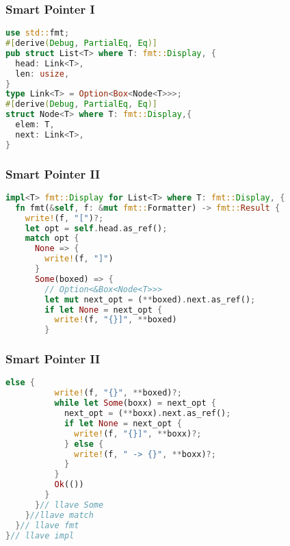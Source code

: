 \documentclass{beamer}
\begin{document}
\begin{frame}[fragile]
  \frametitle{Smart Pointer I}
  \begin{lstlisting}[language=Rust , style=boxed ]
use std::fmt;
#[derive(Debug, PartialEq, Eq)]
pub struct List<T> where T: fmt::Display, {
  head: Link<T>,
  len: usize,
}
type Link<T> = Option<Box<Node<T>>>;
#[derive(Debug, PartialEq, Eq)]
struct Node<T> where T: fmt::Display,{
  elem: T,
  next: Link<T>,
}\end{lstlisting}
\end{frame}

\begin{frame}[fragile]
  \frametitle{Smart Pointer II}
  \begin{lstlisting}[language=Rust , style=boxed ]
impl<T> fmt::Display for List<T> where T: fmt::Display, {
  fn fmt(&self, f: &mut fmt::Formatter) -> fmt::Result {
    write!(f, "[")?;
    let opt = self.head.as_ref();
    match opt {
      None => {
        write!(f, "]")
      }
      Some(boxed) => {
        // Option<&Box<Node<T>>>
        let mut next_opt = (**boxed).next.as_ref();
        if let None = next_opt {
          write!(f, "{}]", **boxed)
        }\end{lstlisting}
\end{frame}

\begin{frame}[fragile]
  \frametitle{Smart Pointer II}
  \begin{lstlisting}[language=Rust , style=boxed ]
        else {
          write!(f, "{}", **boxed)?;
          while let Some(boxx) = next_opt {
            next_opt = (**boxx).next.as_ref();
            if let None = next_opt {
              write!(f, "{}]", **boxx)?;
            } else {
              write!(f, " -> {}", **boxx)?;
            }
          }
          Ok(())
        }
      }// llave Some
    }//llave match
  }// llave fmt
}// llave impl\end{lstlisting}
\end{frame}
\end{document}
